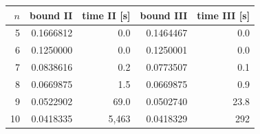 \begin{tabular}{r r r r r}
\toprule
$n$ & bound II & time II [s] & bound III & time III [s] \\
\midrule
5 & 0.1666812 & 0.0 & 0.1464467 & 0.0 \\
6 & 0.1250000 & 0.0 & 0.1250001 & 0.0 \\
7 & 0.0838616 & 0.2 & 0.0773507 & 0.1 \\
8 & 0.0669875 & 1.5 & 0.0669875 & 0.9 \\
9 & 0.0522902 & 69.0 & 0.0502740 & 23.8 \\
10 & 0.0418335 & 5,463 & 0.0418329 & 292 \\
\bottomrule
\end{tabular}
